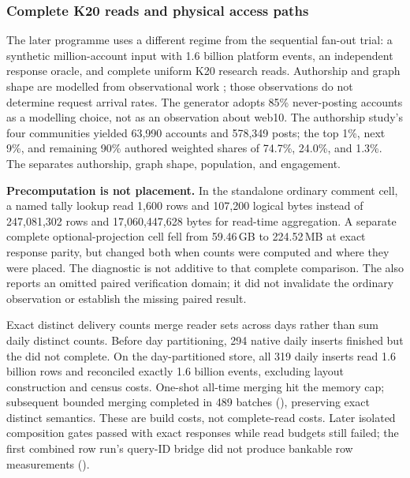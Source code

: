 \subsubsection{Complete K20 reads and physical access paths}
\label{sec:ev-programme}

The later programme uses a different regime from the sequential fan-out
trial: a synthetic million-account input with 1.6 billion platform events,
an independent response oracle, and complete uniform K20 research reads.
Authorship and graph shape are modelled from observational work
\cite{vanmierlo,kwak,ugander}; those observations do not determine request
arrival rates. The generator adopts 85\% never-posting accounts as a
modelling choice, not as an observation about web10. The authorship study's
four communities yielded 63,990 accounts and 578,349 posts; the top 1\%,
next 9\%, and remaining 90\% authored weighted shares of 74.7\%, 24.0\%,
and 1.3\%. The  separates
authorship, graph shape, population, and engagement.

\textbf{Precomputation is not placement.} In the standalone ordinary
comment cell, a named tally lookup read 1,600 rows and 107,200 logical
bytes instead of 247,081,302 rows and 17,060,447,628 bytes for read-time
aggregation. A separate complete optional-projection cell fell from
59.46\,GB to 224.52\,MB at exact response parity, but changed both when
counts were computed and where they were placed. The diagnostic is not
additive to that complete comparison. The
also reports an omitted paired verification domain; it did not invalidate
the ordinary observation or establish the missing paired result.

Exact distinct delivery counts merge reader sets across days rather than
sum daily distinct counts. Before day partitioning, 294 native daily
inserts finished but the 
did not complete. On the day-partitioned store, all 319 daily inserts read
1.6 billion rows and reconciled exactly 1.6 billion events, excluding
layout construction and census costs. One-shot all-time merging hit the
memory cap; subsequent bounded merging completed in 489 batches
(), preserving exact distinct semantics. These are build costs,
not complete-read costs. Later isolated composition gates passed with exact
responses while read budgets still failed; the first combined row run's
query-ID bridge did not produce bankable row measurements
().

